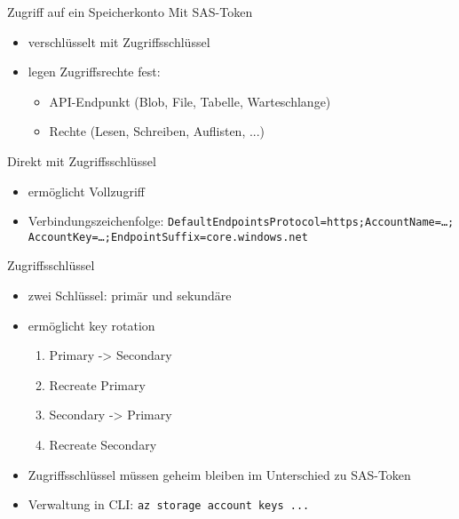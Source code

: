 \begin{flashcard}[Definition]{Zugriff auf ein Speicherkonto}
    Mit SAS-Token
    \begin{itemize}
        \item verschlüsselt mit Zugriffsschlüssel
        \item legen Zugriffsrechte fest:
        \begin{itemize}
            \item API-Endpunkt (Blob, File, Tabelle, Warteschlange)
            \item Rechte (Lesen, Schreiben, Auflisten, ...)
        \end{itemize}
    \end{itemize}

    Direkt mit Zugriffsschlüssel
    \begin{itemize}
        \item ermöglicht Vollzugriff
        \item Verbindungszeichenfolge:\newline
            \texttt{DefaultEndpointsProtocol=https;AccountName={\ldots};\\AccountKey={\ldots};EndpointSuffix=core.windows.net}
    \end{itemize}
\end{flashcard}

\begin{flashcard}[Definition]{Zugriffsschlüssel}
    \begin{itemize}
        \item zwei Schlüssel: primär und sekundäre
        \item ermöglicht key rotation
            \begin{enumerate}
            \item Primary -> Secondary
            \item Recreate Primary
            \item Secondary -> Primary
            \item Recreate Secondary
            \end{enumerate}
        \item Zugriffsschlüssel müssen geheim bleiben\newline
            im Unterschied zu SAS-Token
        \item Verwaltung in CLI:\newline
            \texttt{az storage account keys ...}
    \end{itemize}
\end{flashcard}

